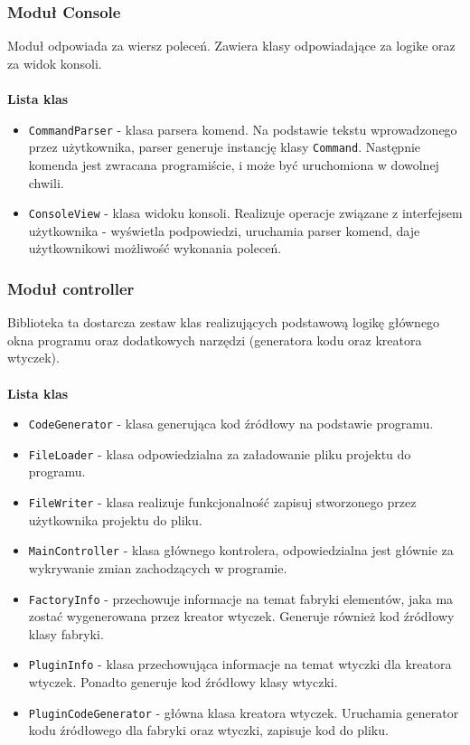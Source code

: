 \documentclass[12pt]{article}
\begin{document}
\subsubsection{Moduł Console}
Moduł odpowiada za wiersz poleceń. Zawiera klasy odpowiadające za logike oraz za widok konsoli. 
\cleardoublepage
\paragraph{}
\textbf{Lista klas}
\vspace{-2mm}
\begin{itemize}
  \setlength{\itemsep}{0em}
\item \texttt{CommandParser} - klasa parsera komend. Na podstawie tekstu wprowadzonego przez użytkownika, parser generuje instancję klasy \texttt{Command}. Następnie komenda jest zwracana programiście, i może być uruchomiona w dowolnej chwili.
\item \texttt{ConsoleView} - klasa widoku konsoli. Realizuje operacje związane z interfejsem użytkownika - wyświetla podpowiedzi, uruchamia parser komend, daje użytkownikowi możliwość wykonania poleceń.
\end{itemize}
\subsubsection{Moduł controller}
Biblioteka ta dostarcza zestaw klas realizujących podstawową logikę głównego okna programu oraz dodatkowych narzędzi (generatora kodu oraz kreatora wtyczek). 
\paragraph{}
\textbf{Lista klas}
\vspace{-2mm}
\begin{itemize}
  \setlength{\itemsep}{0em}
\item \texttt{CodeGenerator} - klasa generująca kod źródłowy na podstawie programu.
\item \texttt{FileLoader} - klasa odpowiedzialna za załadowanie pliku projektu do programu.
\item \texttt{FileWriter} - klasa realizuje funkcjonalność zapisuj stworzonego przez użytkownika projektu do pliku.
\item \texttt{MainController} - klasa głównego kontrolera, odpowiedzialna jest głównie za wykrywanie zmian zachodzących w programie.
\item \texttt{FactoryInfo} - przechowuje informacje na temat fabryki elementów, jaka ma zostać wygenerowana przez kreator wtyczek. Generuje również kod źródłowy klasy fabryki.
\item \texttt{PluginInfo} - klasa przechowująca informacje na temat wtyczki dla kreatora wtyczek. Ponadto generuje kod źródłowy klasy wtyczki.
\item \texttt{PluginCodeGenerator} - główna klasa kreatora wtyczek. Uruchamia generator kodu źródłowego dla fabryki oraz wtyczki, zapisuje kod do pliku.
\end{itemize}
\end{document}
